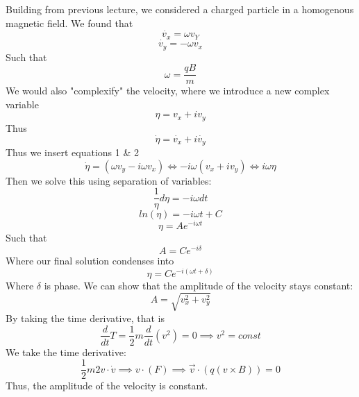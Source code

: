 \documentclass{article}
\newtheorem{one minute paper}[theorem]{One Minute Paper}
\begin{document}
Building from previous lecture, we considered a charged particle in a homogenous magnetic field. We found that 
\begin{equation}
    \dot{v_x} = \omega v_Y
\end{equation}
\begin{equation}
    \dot{v_y} = -\omega v_x
\end{equation}
Such that 
\begin{equation}
    \omega = \frac{qB}{m}
\end{equation}
We would also "complexify" the velocity, where we introduce a new complex variable
\begin{equation}
    \eta = v_x + iv_y
\end{equation}
Thus
\begin{equation}
    \dot{\eta} = \dot{v_x} + i\dot{v_y}
\end{equation}
Thus we insert equations 1 \& 2
\begin{equation}
    \dot{\eta} = (\omega v_y - i\omega v_x) \iff -i\omega (v_x  + iv_y) \iff i\omega \eta
\end{equation}
Then we solve this using separation of variables:
\begin{equation}
    \frac{1}{\eta}d\eta = -i\omega dt
\end{equation}
\begin{equation}
    ln(\eta) = -i\omega t + C
\end{equation}
\begin{equation}
    \eta = Ae^{-i \omega t}
\end{equation}
Such that 
\begin{equation}
    A = Ce^{-i\delta}
\end{equation}
Where our final solution condenses into 
\begin{equation}
    \eta = Ce^{-i(\omega t + \delta)}
\end{equation}
Where $\delta$ is phase. We can show that the amplitude of the velocity stays constant:
\begin{equation}
    A = \sqrt{v_x^2 + v_y^2}
\end{equation}
By taking the time derivative, that is 
\begin{equation}
    \frac{d}{dt}T = \frac{1}{2}m\frac{d}{dt}(v^2) = 0 \implies v^2 = const
\end{equation}
We take the time derivative:
\begin{equation}
    \frac{1}{2}m 2v \cdot \dot{v} \implies v \cdot (F) \implies \vec{v} \cdot (q(v \times B)) = 0
\end{equation}
Thus, the amplitude of the velocity is constant.
\end{document}
